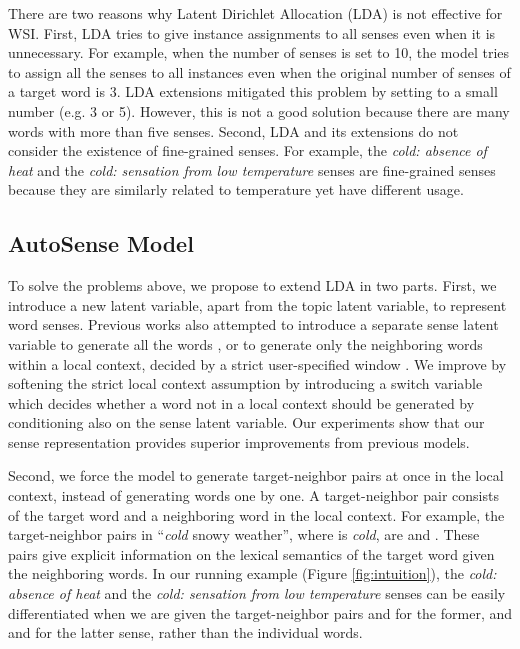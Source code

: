 \documentclass[letterpaper]{article} \usepackage{aaai19}
\begin{document}
There are two reasons why Latent Dirichlet Allocation (LDA) \cite{blei2003latent} is not effective for WSI. First, LDA tries to give instance assignments to all senses even when it is unnecessary. For example, when the number of senses  is set to 10, the model tries to assign all the senses to all instances even when the original number of senses of a target word is 3. LDA extensions \cite{wang2015sense,chang2014inducing} mitigated this problem by setting  to a small number (e.g. 3 or 5). However, this is not a good solution because there are many words with more than five senses. Second, LDA and its extensions do not consider the existence of fine-grained senses. For example, the \textit{cold: absence of heat} and the \textit{cold: sensation from low temperature} senses are fine-grained senses because they are similarly related to temperature yet have different usage. 

\subsection{AutoSense Model}

To solve the problems above, we propose to extend LDA in two parts. First, we introduce a new latent variable, apart from the topic latent variable, to represent word senses. Previous works also attempted to introduce a separate sense latent variable to generate all the words \cite{chang2014inducing}, or to generate only the neighboring words within a local context, decided by a strict user-specified window \cite{wang2015sense}. We improve by softening the strict local context assumption by introducing a switch variable which decides whether a word not in a local context should be generated by conditioning also on the sense latent variable. Our experiments show that our sense representation provides superior improvements from previous models.

Second, we force the model to generate target-neighbor pairs at once in the local context, instead of generating words one by one. A target-neighbor pair  consists of the target word  and a neighboring word  in the local context. For example, the target-neighbor pairs in ``\textit{cold} snowy weather'', where  is \textit{cold}, are  and . These pairs give explicit information on the lexical semantics of the target word given the neighboring words. In our running example (Figure \ref{fig:intuition}), the \textit{cold: absence of heat} and the \textit{cold: sensation from low temperature} senses can be easily differentiated when we are given the target-neighbor pairs  and  for the former, and  and  for the latter sense, rather than the individual words.
\end{document}
